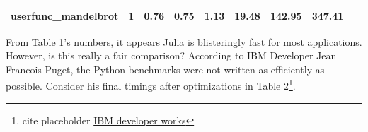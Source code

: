 \documentclass[10pt]{article}
\begin{document}
\begin{table}[ht]
\begin{tabular}{|l|c|c|c|c|c|c|c|}
\textbf{userfunc\_mandelbrot} & 1                                                                & 0.76                                                           & 0.75                                                                 & 1.13                                                              & 19.48                                                                 & 142.95                                                          & 347.41                                                     \\ \hline
\end{tabular}
\end{table}

From Table 1's numbers, it appears Julia is blisteringly fast for most applications. However, is this really a fair comparison? According to IBM Developer Jean Francois Puget, the Python benchmarks were not written as efficiently as possible. Consider his final timings after optimizations in Table 2\footnote{cite placeholder \href{https://www.ibm.com/developerworks/community/blogs/jfp/entry/Python_Meets_Julia_Micro_Performance?lang=en}{IBM developer works}}.
\end{document}
